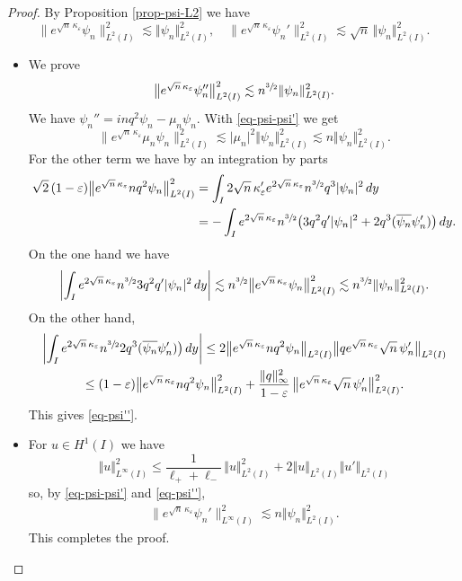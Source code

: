 \documentclass[11pt]{article}
\numberwithin{equation}{section}
\theoremstyle{plain}
\theoremstyle{definition}
\newcommand{\abs}[1]{\vert #1\vert}
\newcommand{\bbabs}[1]{\biggl\vert #1\biggr\vert}
\newcommand{\nr}[1]{\Vert #1\Vert}
\newcommand{\1}{\mathds 1}
\let\Re\relax
\DeclareMathOperator{\Re}{\mathsf{Re}\mkern2mu}
\let\e\varepsilon
\let\k\kappa
\begin{document}
\begin{proof}
By Proposition \ref{prop-psi-L2} we have
\begin{equation} \label{eq-psi-psi'}
\big\|e^{\sqrt n\,\kappa_\e} \psi_n\big\|_{L^2(I)}^2 \lesssim \nr{\psi_n}_{L^2(I)}^2, \quad
\big\|e^{\sqrt n\,\kappa_\e} \psi_n'\big\|_{L^2(I)}^2 \lesssim \sqrt n\,\nr{\psi_n}_{L^2(I)}^2.
\end{equation}

\begin{itemize}
\item
We prove
\begin{equation} \label{eq-psi''}
\big\|e^{\sqrt n\,\kappa_\e} \psi_n''\big\|_{L^2(I)}^2 \lesssim n^{\sfrac 32} \nr{\psi_n}_{L^2(I)}^2.
\end{equation}
We have $\psi_n'' = inq^2 \psi_n - \mu_n \psi_n$. With \eqref{eq-psi-psi'} we get
\[
\big\| e^{\sqrt n\,\kappa_\e} \mu_n \psi_n \big\|_{L^2(I)}^2 \lesssim \abs{\mu_n}^2 \nr{\psi_n}_{L^2(I)}^2 \lesssim n \nr{\psi_n}_{L^2(I)}^2.
\]
For the other term we have by an integration by parts
\begin{align*}
\sqrt 2\, (1-\e) \big\| e^{\sqrt n\,\kappa_\e} n q^2 \psi_n \big\|_{L^2(I)}^2
& = \int_I 2 \sqrt n\,\k_\e' e^{2 \sqrt n\,\kappa_\e} n^{\sfrac 32} q^3 \abs{\psi_n}^2 \, dy\\
& = -\int_I e^{2 \sqrt n\,\kappa_\e} n^{\sfrac 32} \bigl(3 q^2 q' \abs{\psi_n}^2 + 2 q^3 \Re(\overline{\psi_n} \psi_n') \bigr) \, dy.
\end{align*}
On the one hand we have
\[
\bbabs{\int_I e^{2 \sqrt n\,\kappa_\e} n^{\sfrac 32} 3 q^2 q' \abs{\psi_n}^2 \, dy} \lesssim n^{\sfrac 32} \big\| e^{\sqrt n\,\kappa_\e} \psi_n \big\|_{L^2(I)}^2 \lesssim n^{\sfrac 32} \nr{\psi_n}_{L^2(I)}^2.
\]
On the other hand,
\begin{multline*}
\bbabs{\int_I e^{2 \sqrt n\,\kappa_\e} n^{\sfrac 32} 2 q^3 \Re(\overline{\psi_n} \psi_n') \bigr) \, dy} \leq 2 \big\|e^{\sqrt n\,\kappa_\e} n q^2 \psi_n\big\|_{L^2(I)} \big\| q e^{\sqrt n\,\kappa_\e} \sqrt n\,\psi_n'\big\|_{L^2(I)}\\
\leq (1-\e) \big\|e^{\sqrt n\,\kappa_\e} n q^2 \psi_n\big\|_{L^2(I)}^2 + \frac {\nr{q}_\infty^2}{1-\e}\, \big\|e^{\sqrt n\,\kappa_\e} \sqrt n\,\psi_n'\big\|_{L^2(I)}^2.
\end{multline*}
This gives \eqref{eq-psi''}.

\item
For $u \in H^1(I)$ we have
\[
\nr{u}_{L^\infty(I)}^2 \leq \frac{1}{\ell_+ +\ell_-}\, \nr{u}_{L^2(I)}^2 + 2 \nr{u}_{L^2(I)}\nr{u'}_{L^2(I)}
\]
so, by \eqref{eq-psi-psi'} and \eqref{eq-psi''},
\begin{align*}
\big\|e^{\sqrt n\,\kappa_\e} \psi_n'\big\|_{L^\infty(I)}^2
\lesssim n \nr{\psi_n}_{L^2(I)}^2.
\end{align*}
This completes the proof.\qedhere
\end{itemize}
\end{proof}
\end{document}
